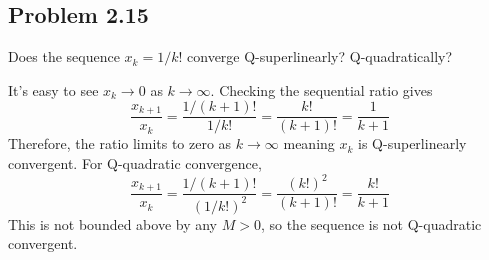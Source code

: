  \subsection{Problem 2.15}
 Does the sequence $x_k = 1/k!$ converge Q-superlinearly? Q-quadratically?
 \partbreak
 \begin{solution}

     It's easy to see $x_k \rightarrow 0$ as $ k \rightarrow \infty$. Checking the sequential ratio gives
     \[
     \frac{x_{k+1}}{x_k} = \frac{1/(k+1)!}{1/k!} = \frac{k!}{(k+1)!} = \frac{1}{k+1}
     \]
     Therefore, the ratio limits to zero as $k \rightarrow \infty$ meaning $x_k$ is Q-superlinearly convergent. For Q-quadratic convergence,
     \[
     \frac{x_{k+1}}{x_k} = \frac{1/(k+1)!}{(1/k!)^2} = \frac{(k!)^2}{(k+1)!} = \frac{k!}{k+1}
     \]
     This is not bounded above by any $M > 0$, so the sequence is not Q-quadratic convergent.
 \end{solution}

 \newpage
